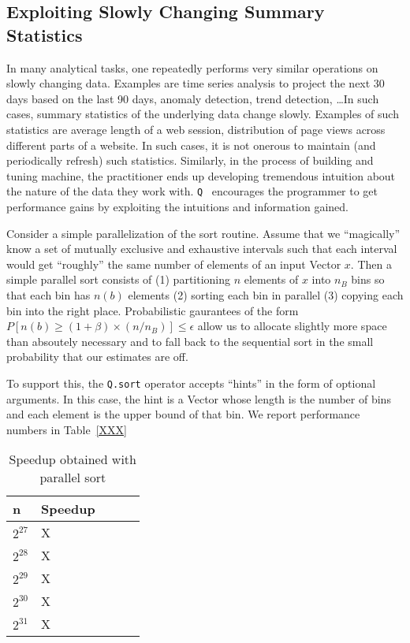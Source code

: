 \newcommand{\Q}{{\tt Q} }
\subsection{Exploiting Slowly Changing Summary Statistics}

In many analytical tasks, one repeatedly performs very similar operations on slowly
changing data. Examples are time series analysis to project the next 30 days
based on the last 90 days, anomaly detection, trend detection, \ldots In such
cases, summary statistics of the underlying data change slowly. Examples of such
statistics are average length of a web session, distribution of page views
across different parts of a website.  
In such cases, it is not onerous to
maintain (and periodically refresh) such statistics. 
Similarly, 
in the process of building and tuning machine, the practitioner ends up
developing tremendous intuition about the nature of the data they work with.
\Q\ encourages 
the programmer to get performance gains by exploiting the intuitions and
information gained.

Consider a simple parallelization of the sort routine. Assume that we 
``magically'' know a set of mutually exclusive and exhaustive intervals such
that each interval would get ``roughly'' the same number of elements of an input
Vector \(x\). Then a simple parallel sort consists of 
(1) partitioning \(n\) elements of \(x\) into \(n_B\) bins so that each bin has
\(n(b)\) elements
(2) sorting each bin in parallel
(3) copying each bin into the right place. Probabilistic gaurantees
of the form \(P[n(b) \geq (1+\beta) \times(n/n_B)] \leq \epsilon\) 
allow us to allocate slightly more space than absoutely necessary and to 
fall back to the sequential sort in the small probability that our estimates are off.

To support this, the {\tt Q.sort} operator accepts ``hints'' in the form of
optional arguments. In this case, the hint is a Vector whose length is the
number of bins and each element is the upper bound of that bin. We report
performance numbers in Table~\ref{XXX}

\begin{table}
\centering
\begin{tabular}{|l|l|l|l|l|} \hline \hline
  {\bf n} & {\bf Speedup} \\ \hline \hline
  \(2^{27}\) & X \\ \hline
  \(2^{28}\) & X \\ \hline
  \(2^{29}\) & X \\ \hline
  \(2^{30}\) & X \\ \hline
  \(2^{31}\) & X \\ \hline
  \hline
\end{tabular}
\caption{Speedup obtained with parallel sort}
\label{tbl_sort_speedup}
\end{table}


